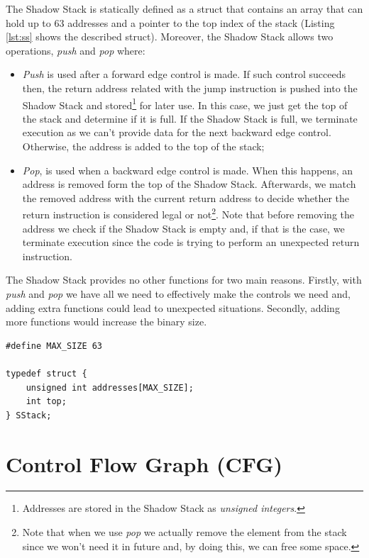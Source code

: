 The Shadow Stack is statically defined as a struct that contains an array that can
hold up to $63$ addresses and a pointer to the top index of the stack (Listing
\ref{lst:ss} shows the described struct). Moreover, the Shadow Stack allows two operations,
\textit{push} and \textit{pop} where:
\begin{itemize}
  \item \textit{Push} is used after a forward edge control is made. If such control
    succeeds then, the return address related with the jump instruction is
    pushed into the Shadow Stack and stored\footnote{Addresses are stored in the
    Shadow Stack as \textit{unsigned integers}.} for later use. In this case, we
    just get the top of the stack and determine if it is full. If the Shadow
    Stack is full, we terminate execution as we can't provide data for the next backward
    edge control. Otherwise, the address is added to the top of the stack;

  \item \textit{Pop}, is used when a backward edge control is made. When this
    happens, an address is removed form the top of the Shadow Stack. Afterwards,
    we match the removed address with the current return address to decide whether
    the return instruction is considered legal or not\footnote{Note that when we
    use \textit{pop} we actually remove the element from the stack since we won't
    need it in future and, by doing this, we can free some space.}. Note that before
    removing the address we check if the Shadow Stack is empty and, if that is
    the case, we terminate execution since the code is trying to perform an unexpected
    return instruction.
\end{itemize}

The Shadow Stack provides no other functions for two main reasons. Firstly, with
\textit{push} and \textit{pop} we have all we need to effectively make the
controls we need and, adding extra functions could lead to unexpected situations.
Secondly, adding more functions would increase the binary size.

\begin{lstlisting}[style=CStyle, caption = Shadow Stack definition, label={lst:ss}]
#define MAX_SIZE 63

typedef struct {
    unsigned int addresses[MAX_SIZE];
    int top;
} SStack;
\end{lstlisting}

\section{Control Flow Graph (CFG)}
\label{sec:project_cfg}


